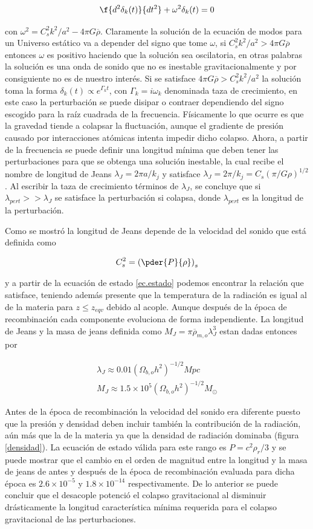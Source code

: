 \[
\f{d^2\delta_k(t)}{dt^2} +
\omega^2\delta_k(t) = 0
\]

con $\omega^2 = C_s^2k^2/a^2-4\pi G\overline{\rho}$. Claramente la solución de la 
ecuación de modos para un Universo estático va a depender del signo que tome 
$\omega$, si $C_s^2k^2/a^2>4\pi G\overline{\rho}$ entonces $\omega$ es positivo 
haciendo que la solución sea oscilatoria, en otras palabras la solución es una 
onda de sonido que no es inestable gravitacionalmente y 
por consiguiente no es de nuestro interés.
Si se satisface $4\pi G\overline{\rho}>C_s^2k^2/a^2$ la solución toma la forma
$\delta_k(t)\propto e^{\Gamma_k t}$, con $\Gamma_k=i\omega_k$ denominada 
taza de crecimiento, en este caso
la perturbación se puede disipar o contraer dependiendo del signo escogido para 
la raíz cuadrada de la frecuencia. Físicamente lo que ocurre es que 
la gravedad tiende a colapsar la fluctuación, aunque el 
gradiente de presión causado por interacciones atómicas 
intenta impedir dicho colapso. Ahora, a partir de la frecuencia 
se puede definir una longitud mínima que deben tener las 
perturbaciones para que se obtenga una solución inestable, 
la cual recibe el nombre de longitud de Jeans $\lambda_J = 2\pi a/k_j$
y satisface $\lambda_J = 2\pi/k_j = C_s(\pi/G\rho)^{1/2}$.
Al escribir la taza de crecimiento términos de $\lambda_J$, 
se concluye que si $\lambda_{pert}>>\lambda_J$ se satisface la 
perturbación si colapsa, donde $\lambda_{pert}$ es la longitud
de la perturbación. 

Como se mostró la longitud de Jeans depende de la velocidad del 
sonido que está definida como 

\[
C_s^2 = \left( \pder{P}{\rho} \right)_s
\]

y a partir de la ecuación de estado \ref{ec.estado} podemos encontrar
la relación que satisface, teniendo además presente que la temperatura de la 
radiación es igual al de la materia para $z \leq z_{eqv}$
debido al acople. Aunque después de la época de recombinación 
cada componente evoluciona de forma independiente. La longitud de Jeans
y la masa de jeans definida como $M_J =  \pi\overline{\rho}_{m,o}\lambda_J^3 $
estan dadas entonces por 

\begin{eqnarray}
\lambda_J \approx 0.01(\Omega_{b,o}h^2)^{-1/2}Mpc\\
M_J \approx 1.5\times 10^5 (\Omega_{b,o}h^2)^{-1/2}M_{\odot}
\end{eqnarray}

Antes de la época de recombinación la velocidad del sonido era
diferente puesto que la presión y densidad 
deben incluir también la contribución de la radiación, 
aún más que la de la materia ya que 
la densidad de radiación dominaba (figura \ref{densidad}). 
La ecuación de estado válida para este rango es $P = c^2\rho_r/3$
y se puede mostrar que el cambio en el orden 
de magnitud entre la longitud y la masa de jeans 
de antes y después de la época de recombinación evaluada para dicha
época es $2.6\times 10^{-5}$  y $1.8\times 10^{-14}$ respectivamente. 
De lo anterior se puede
concluir que el desacople potenció el colapso gravitacional 
al disminuir drásticamente la longitud característica 
mínima requerida para el colapso gravitacional de las perturbaciones.

